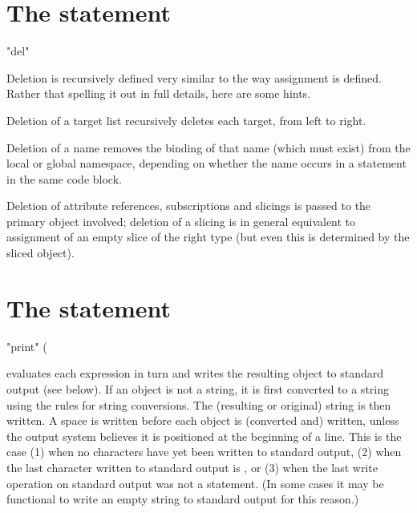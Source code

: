\section{The  statement \label{del}}

\begin{productionlist}
             {"del" }
\end{productionlist}

Deletion is recursively defined very similar to the way assignment is
defined. Rather that spelling it out in full details, here are some
hints.

Deletion of a target list recursively deletes each target, from left
to right.

Deletion of a name removes the binding of that name (which must exist)
from the local or global namespace, depending on whether the name
occurs in a  statement in the same code block.

Deletion of attribute references, subscriptions and slicings
is passed to the primary object involved; deletion of a slicing
is in general equivalent to assignment of an empty slice of the
right type (but even this is determined by the sliced object).


\section{The  statement \label{print}}

\begin{productionlist}
             {"print" ( }
\end{productionlist}

 evaluates each expression in turn and writes the
resulting object to standard output (see below).  If an object is not
a string, it is first converted to a string using the rules for string
conversions.  The (resulting or original) string is then written.  A
space is written before each object is (converted and) written, unless
the output system believes it is positioned at the beginning of a
line.  This is the case (1) when no characters have yet been written
to standard output, (2) when the last character written to standard
output is , or (3) when the last write operation on
standard output was not a  statement.  (In some cases
it may be functional to write an empty string to standard output for
this reason.)  

